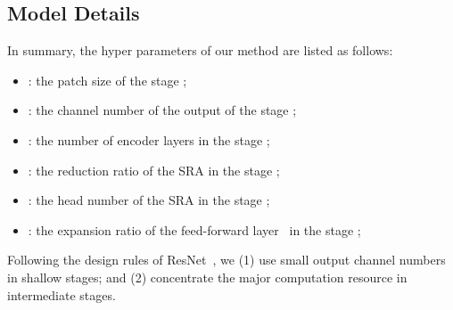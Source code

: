 \documentclass[10pt,twocolumn,letterpaper]{article}
\begin{document}
\subsection{Model Details}
In summary, the hyper parameters of our method are listed as follows:
\begin{itemize}
    \item : the patch size of the stage ;
    \item : the channel number of the output of the stage ;
    \item : the number of encoder layers in the stage ;
    \item : the reduction ratio of the SRA in the stage ;
    \item : the head number of the SRA in the stage ;
    \item : the expansion ratio of the feed-forward layer~\cite{vaswani2017attention} in the stage ;
\end{itemize}
Following the design rules of ResNet~\cite{he2016deep}, we (1) use small output channel numbers in shallow stages; and (2) concentrate the major computation resource
in intermediate stages.
\end{document}
